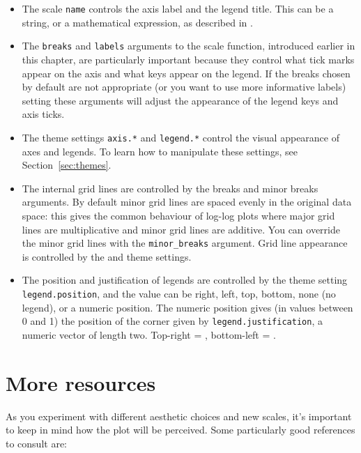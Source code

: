 \begin{itemize}
  \item The scale {\tt name} controls the axis label and the legend title.  This can be a string, or a mathematical expression, as described in .
  
  \item The {\tt breaks} and {\tt labels} arguments to the scale function, introduced earlier in this chapter, are particularly important because they control what tick marks appear on the axis and what keys appear on the legend.  If the breaks chosen by default are not appropriate (or you want to use more informative labels) setting these arguments will adjust the appearance of the legend keys and axis ticks.  
  
  \item The theme settings {\tt axis.*} and {\tt legend.*} control the visual appearance of axes and legends.  To learn how to manipulate these settings, see Section~\ref{sec:themes}.

  \item The internal grid lines are controlled by the breaks and minor breaks arguments.  By default minor grid lines are spaced evenly in the original data space: this gives the common behaviour of log-log plots where major grid lines are multiplicative and minor grid lines are additive.  You can override the minor grid lines with the {\tt minor\_breaks} argument.  Grid line appearance is controlled by the  and  theme settings.

  \item The position and justification of legends are controlled by the theme setting {\tt legend.position}, and the value can be right, left, top, bottom, none (no legend), or a numeric position.  The numeric position gives (in values between 0 and 1) the position of the corner given by {\tt legend.justification}, a numeric vector of length two.  Top-right = , bottom-left = .
  
\end{itemize}

\section{More resources}
\label{sec:scale-resources}

As you experiment with different aesthetic choices and new scales, it's important to keep in mind how the plot will be perceived.   Some particularly good references to consult are:

